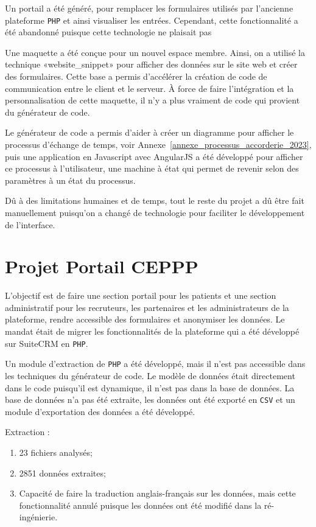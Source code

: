 Un portail a été généré, pour remplacer les formulaires utilisés par l'ancienne plateforme \texttt{PHP} et ainsi visualiser les entrées. Cependant, cette fonctionnalité a été abandonné puisque cette technologie ne plaisait pas

Une maquette a été conçue pour un nouvel espace membre. Ainsi, on a utilisé la technique «website\_snippet» pour afficher des données sur le site web et créer des formulaires. Cette base a permis d’accélérer la création de code de communication entre le client et le serveur. À force de faire l’intégration et la personnalisation de cette maquette, il n’y a plus vraiment de code qui provient du générateur de code.

Le générateur de code a permis d’aider à créer un diagramme pour afficher le processus d’échange de temps, voir Annexe~\ref{annexe_processus_accorderie_2023}, puis une application en Javascript avec AngularJS a été développé pour afficher ce processus à l’utilisateur, une machine à état qui permet de revenir selon des paramètres à un état du processus.

Dû à des limitations humaines et de temps, tout le reste du projet a dû être fait manuellement puisqu’on a changé de technologie pour faciliter le développement de l’interface.

\section{Projet Portail CEPPP}

L'objectif est de faire une section portail pour les patients et une section administratif pour les recruteurs, les partenaires et les administrateurs de la plateforme, rendre accessible des formulaires et anonymiser les données. Le mandat était de migrer les fonctionnalités de la plateforme qui a été développé sur SuiteCRM en \texttt{PHP}.

Un module d'extraction de \texttt{PHP} a été développé, mais il n'est pas accessible dans les techniques du générateur de code. Le modèle de données était directement dans le code puisqu'il est dynamique, il n'est pas dans la base de données. La base de données n'a pas été extraite, les données ont été exporté en \texttt{CSV} et un module d'exportation des données a été développé.

Extraction : 
\begin{enumerate}
    \item 23 fichiers analysés;
    \item 2851 données extraites;
    \item Capacité de faire la traduction anglais-français sur les données, mais cette fonctionnalité annulé puisque les données ont été modifié dans la ré-ingénierie.
\end{enumerate}

